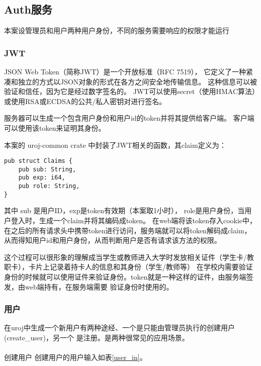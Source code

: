 \subsection{Auth服务}
本案设管理员和用户两种用户身份，不同的服务需要响应的权限才能运行
\subsubsection{JWT}
JSON Web Token（简称JWT）是一个开放标准（RFC 7519）\cite{rfc7519}，
它定义了一种紧凑和独立的方式以JSON对象的形式在各方之间安全地传输信息。
这种信息可以被验证和信任，因为它是经过数字签名的。
JWT可以使用secret（使用HMAC算法）或使用RSA或ECDSA的公共/私人密钥对进行签名。

服务器可以生成一个包含用户身份和用户id的token并将其提供给客户端。
客户端可以使用该token来证明其身份。

本案的 uroj-common crate 中封装了JWT相关的函数，其claim定义为：
\begin{lstlisting}
pub struct Claims {
    pub sub: String,
    pub exp: i64,
    pub role: String,
}
\end{lstlisting}

其中 sub 是用户ID，exp是token有效期（本案取1小时），
role是用户身份，当用户登入时，生成一个claim并将其编码成token。
在web端将该token存入cookie中，在之后的所有请求头中携带token进行访问，服务端就可以将token解码成claim，
从而得知用户id和用户身份，从而判断用户是否有请求该方法的权限。

这个过程可以很形象的理解成当学生或教师进入大学时发放相关证件（学生卡/教职卡），卡片上记录着持卡人的信息和其身份（学生/教师等）
在学校内需要验证身份的时候就可以使用证件来验证身份。token就是一种这样的证件，由服务端签发，由web端持有，在服务端需要
验证身份时使用的。

\subsubsection{用户}
在uroj中生成一个新用户有两种途经、一个是只能由管理员执行的创建用户(create\_user)，另一个
是注册。是两种很常见的应用场景。

\paragraph{}创建用户
创建用户的用户输入如表\ref{user_in}。

